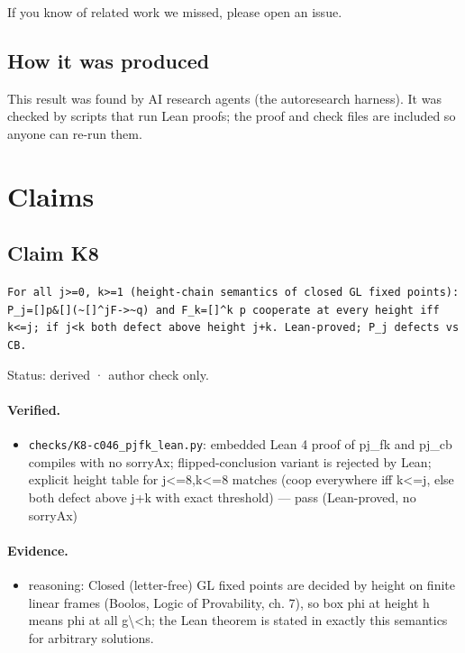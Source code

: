 \documentclass{article}
\begin{document}
If you know of related work we missed, please open an issue.

\subsection*{How it was produced}

This result was found by AI research agents (the autoresearch harness). It was checked by scripts that run Lean proofs; the proof and check files are included so anyone can re-run them.

\section{Claims}

\subsection*{Claim K8}

\texttt{For all j\textgreater{}=0, k\textgreater{}=1 (height-chain semantics of closed GL fixed points): P\_j=[]p\&[](\textasciitilde{}[]\textasciicircum{}jF-\textgreater{}\textasciitilde{}q) and F\_k=[]\textasciicircum{}k p cooperate at every height iff k\textless{}=j; if j\textless{}k both defect above height j+k. Lean-proved; P\_j defects vs CB.}

Status: derived · author check only.

\paragraph{Verified.}
\begin{itemize}
\item \texttt{checks/K8-c046\_pjfk\_lean.py}: embedded Lean 4 proof of pj\_fk and pj\_cb compiles with no sorryAx; flipped-conclusion variant is rejected by Lean; explicit height table for j\textless{}=8,k\textless{}=8 matches (coop everywhere iff k\textless{}=j, else both defect above j+k with exact threshold) --- pass (Lean-proved, no sorryAx)
\end{itemize}

\paragraph{Evidence.}
\begin{itemize}
\item reasoning: Closed (letter-free) GL fixed points are decided by height on finite linear frames (Boolos, Logic of Provability, ch. 7), so box phi at height h means phi at all g\textbackslash{}\textless{}h; the Lean theorem is stated in exactly this semantics for arbitrary solutions.
\end{itemize}
\end{document}
